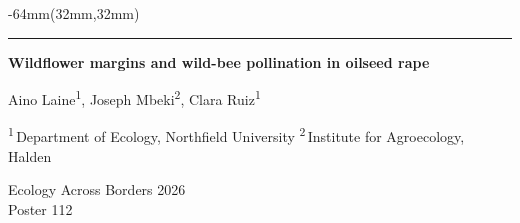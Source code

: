 \documentclass{article}
\newcommand{\postertitle}{Wildflower margins and wild-bee pollination in oilseed rape}
\newcommand{\posterauthors}{Aino Laine\textsuperscript{1}, Joseph Mbeki\textsuperscript{2}, Clara Ruiz\textsuperscript{1}}
\newcommand{\posteraffiliations}{\textsuperscript{1}\,Department of Ecology, Northfield University\quad
  \textsuperscript{2}\,Institute for Agroecology, Halden}
\newcommand{\postervenue}{Ecology Across Borders 2026\\Poster 112}
\renewcommand{\normalsize}{\fontsize{15.5}{22}\selectfont}
\renewcommand{\small}{\fontsize{13}{18}\selectfont}
\newcommand{\lsleft}{32mm}
\newlength{\lsside}\setlength{\lsside}{100mm}
\newlength{\lsband}\setlength{\lsband}{286mm}
\begin{document}
\begin{textblock*}{-64mm\relax}(\lsleft,32mm)
  {\color{lsInk}\rule{\linewidth}{1.6pt}}\par\vspace{5mm}
  \begin{minipage}[t]{\dimexpr\lsside+\lsband+22mm\relax}
    {\fontsize{24}{30}\selectfont\bfseries\postertitle\par}\vspace{2mm}
    {\normalsize\posterauthors\par}
    {\small\color{lsMuted}\posteraffiliations\par}
  \end{minipage}\hfill
  \begin{minipage}[t]{\lsside}\raggedleft
    {\small\color{lsMuted}\postervenue\par}
  \end{minipage}
\end{textblock*}
\end{document}
